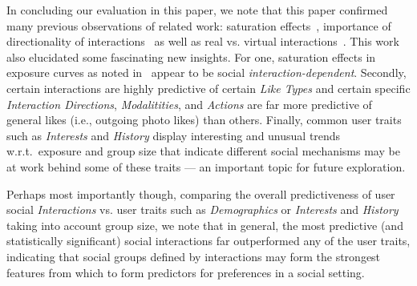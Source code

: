 In concluding our evaluation in this paper, we note that this paper
confirmed many previous observations of related work: saturation
effects~\cite{Romero2011hashtag}, importance of directionality of
interactions~\cite{saez2011high} as well as real vs. virtual
interactions~\cite{brandtzag2011facebook}.  This work also elucidated
some fascinating new insights.  For one, saturation effects in
exposure curves as noted in~\cite{Romero2011hashtag} appear to be
social \emph{interaction-dependent}.  Secondly, certain interactions
are highly predictive of certain \textit{Like Types} and certain
specific \emph{Interaction Directions}, \emph{Modalitities}, and
\emph{Actions} are far more predictive of general likes (i.e.,
outgoing photo likes) than others.  Finally, common user traits such
as \emph{Interests} and \emph{History} display interesting and unusual
trends w.r.t.\ exposure and group size that indicate different social
mechanisms may be at work behind some of these traits --- an important
topic for future exploration.

Perhaps most importantly though, comparing the overall predictiveness
of user social \textit{Interactions} vs. user traits such as
\textit{Demographics} or \textit{Interests} and \textit{History}
taking into account group size, we note that in general, the most
predictive (and statistically significant) social interactions far
outperformed any of the user traits, indicating that social groups
defined by interactions may form the strongest features from which to
form predictors for preferences in a social setting.
